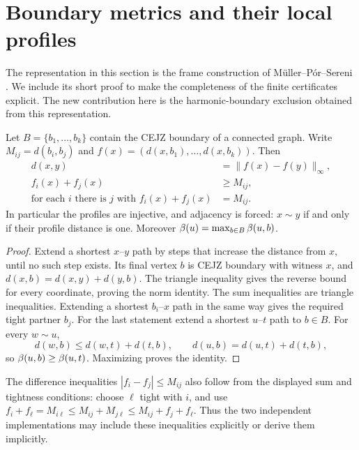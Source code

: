 \section{Boundary metrics and their local profiles}\label{sec:frames}
The representation in this section is the frame construction of
M\"uller--P\'or--Sereni \cite[Lemmas 7--8 and Theorem 13]{muller}.
We include its short proof to make the completeness of the finite
certificates explicit. The new contribution here is the harmonic-boundary
exclusion obtained from this representation.

\begin{lemma}\label{lem:profiles}
Let $B=\{b_1,\ldots,b_k\}$ contain the CEJZ boundary of a connected graph.
Write $M_{ij}=d(b_i,b_j)$ and $f(x)=(d(x,b_1),\ldots,d(x,b_k))$. Then
\begin{align*}
 d(x,y)&=\|f(x)-f(y)\|_\infty,\\
 f_i(x)+f_j(x)&\ge M_{ij},\\
 \text{for each }i\text{ there is }j\text{ with }f_i(x)+f_j(x)&=M_{ij}.
\end{align*}
In particular the profiles are injective, and adjacency is forced:
$x\sim y$ if and only if their profile distance is one.
Moreover $\beta(u)=\max_{b\in B}\beta(u,b)$.
\end{lemma}
\begin{proof}
Extend a shortest $x$--$y$ path by steps that increase the distance from
$x$, until no such step exists. Its final vertex $b$ is CEJZ boundary
with witness $x$, and $d(x,b)=d(x,y)+d(y,b)$. The triangle inequality
gives the reverse bound for every coordinate, proving the norm identity.
The sum inequalities are triangle inequalities. Extending a shortest
$b_i$--$x$ path in the same way gives the required tight partner $b_j$.
For the last statement extend a shortest $u$--$t$ path to $b\in B$.
For every $w\sim u$,
\[
 d(w,b)\le d(w,t)+d(t,b),\qquad
 d(u,b)=d(u,t)+d(t,b),
\]
so $\beta(u,b)\ge\beta(u,t)$. Maximizing proves the identity.
\end{proof}
The difference inequalities $|f_i-f_j|\le M_{ij}$ also follow from the
displayed sum and tightness conditions: choose $\ell$ tight with $i$,
and use $f_i+f_\ell=M_{i\ell}\le M_{ij}+M_{j\ell}
\le M_{ij}+f_j+f_\ell$. Thus the two independent implementations may
include these inequalities explicitly or derive them implicitly.

